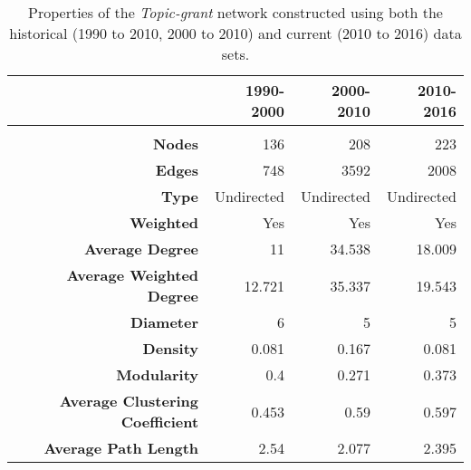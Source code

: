 \begin{table}[!htbp]
\centering
\caption[Properties of the \textit{Topic-grant} network constructed using both the historical (1990 to 2000, 2000 to 2010) and current (2010 to 2016) data sets]{Properties of the \textit{Topic-grant} network constructed using both the historical (1990 to 2010, 2000 to 2010) and current (2010 to 2016) data sets.}
\label{table:topic_a_properties}
\begin{tabular}{r|rrr}
{} & \textbf{1990-2000} & \textbf{2000-2010} & \textbf{2010-2016}\\
\hline\\
\textbf{Nodes}                          & {136}     & {208}     & {223}\\
\textbf{Edges}                          & {748}     & {3592}    & {2008}\\
\textbf{Type}                           & {Undirected} & {Undirected} & {Undirected}\\
\textbf{Weighted}                       & {Yes}     & {Yes}     & {Yes}\\
\textbf{Average Degree}                 & {11}      & {34.538}  & {18.009}\\
\textbf{Average Weighted Degree}        & {12.721}  & {35.337}  & {19.543}\\
\textbf{Diameter}                       & {6}       & {5}       & {5}\\
\textbf{Density}                        & {0.081}   & {0.167}   & {0.081}\\
\textbf{Modularity}                     & {0.4}     & {0.271}   & {0.373}\\
\textbf{Average Clustering Coefficient} & {0.453}   & {0.59}    & {0.597}\\
\textbf{Average Path Length}            & {2.54}    & {2.077}   & {2.395}\\
\end{tabular}
\end{table}

